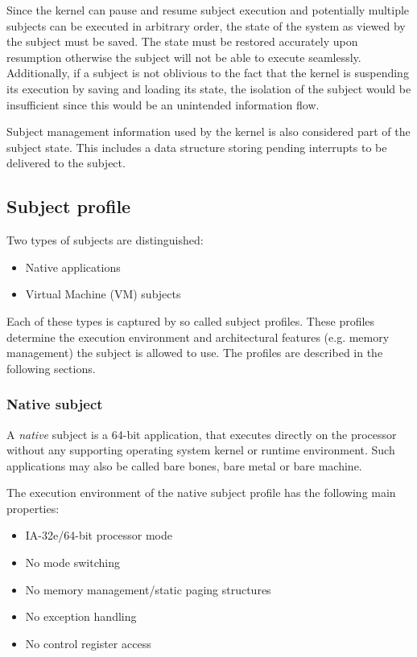 Since the kernel can pause and resume subject execution and potentially multiple
subjects can be executed in arbitrary order, the state of the system as viewed
by the subject must be saved. The state must be restored accurately upon
resumption otherwise the subject will not be able to execute seamlessly.
Additionally, if a subject is not oblivious to the fact that the kernel is
suspending its execution by saving and loading its state, the isolation of the
subject would be insufficient since this would be an unintended information
flow.

Subject management information used by the kernel is also considered part of the
subject state. This includes a data structure storing pending interrupts to be
delivered to the subject.

\subsection{Subject profile}
Two types of subjects are distinguished:

\begin{itemize}
	\item Native applications
	\item Virtual Machine (VM) subjects
\end{itemize}

Each of these types is captured by so called subject profiles. These profiles
determine the execution environment and architectural features (e.g. memory
management) the subject is allowed to use. The profiles are described in the
following sections.

\subsubsection{Native subject}
A \emph{native} subject is a 64-bit application, that executes directly on the
processor without any supporting operating system kernel or runtime environment.
Such applications may also be called bare bones, bare metal or bare machine.

The execution environment of the native subject profile has the following main
properties:

\begin{itemize}
	\item IA-32e/64-bit processor mode
	\item No mode switching
	\item No memory management/static paging structures
	\item No exception handling
	\item No control register access
\end{itemize}

